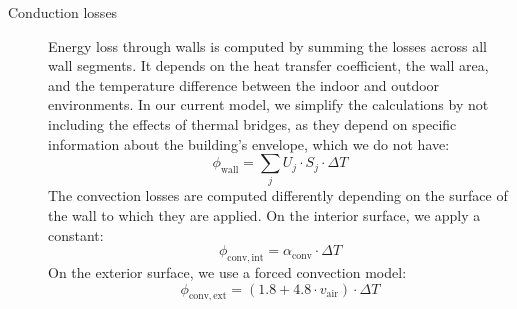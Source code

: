 \documentclass[runningheads]{llncs}
\begin{document}
\begin{description}
\item[Conduction losses] Energy loss through walls is computed by summing the losses across all wall segments. It depends on the heat transfer coefficient, the wall area, and the temperature difference between the indoor and outdoor environments. In our current model, we simplify the calculations by not including the effects of thermal bridges, as they depend on specific information about the building's envelope, which we do not have:
\begin{equation}
  \phi_{\mathrm{wall}} = \sum_{j} U_j \cdot S_j \cdot \Delta T
\end{equation}
The convection losses are computed differently depending on the surface of the wall to which they are applied. On the interior surface, we apply a constant:
\begin{equation}
  \phi_{\mathrm{conv,int}} = \alpha_{\mathrm{conv}} \cdot \Delta T
\end{equation}
On the exterior surface, we use a forced convection model:
\begin{equation}
  \phi_{\mathrm{conv,ext}} = \left( 1.8 + 4.8 \cdot v_{\mathrm{air}} \right) \cdot \Delta T
\end{equation}


\end{description}
\end{document}
